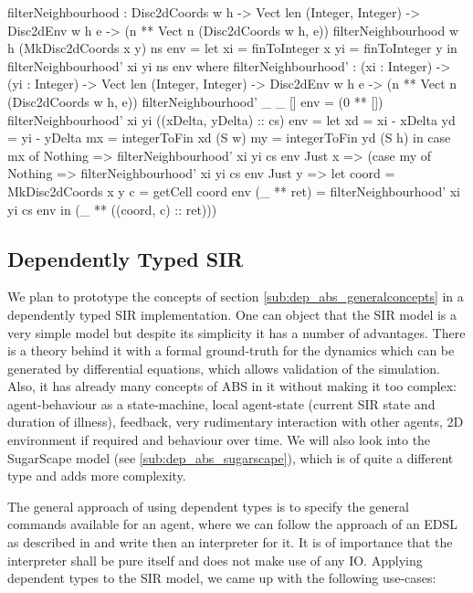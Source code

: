 \begin{HaskellCode}
filterNeighbourhood :  Disc2dCoords w h
                    -> Vect len (Integer, Integer)
                    -> Disc2dEnv w h e 
                    -> (n ** Vect n (Disc2dCoords w h, e))
filterNeighbourhood {w} {h} (MkDisc2dCoords x y) ns env =
    let xi = finToInteger x
        yi = finToInteger y
    in  filterNeighbourhood' xi yi ns env
  where
    filterNeighbourhood' :  (xi : Integer)
                         -> (yi : Integer)
                         -> Vect len (Integer, Integer)
                         -> Disc2dEnv w h e 
                         -> (n ** Vect n (Disc2dCoords w h, e))
    filterNeighbourhood' _ _ [] env = (0 ** [])
    filterNeighbourhood' xi yi ((xDelta, yDelta) :: cs) env 
      = let xd = xi - xDelta
            yd = yi - yDelta
            mx = integerToFin xd (S w)
            my = integerToFin yd (S h)
        in case mx of
            Nothing => filterNeighbourhood' xi yi cs env 
            Just x  => (case my of 
                        Nothing => filterNeighbourhood' xi yi cs env 
                        Just y  => let coord      = MkDisc2dCoords x y
                                       c          = getCell coord env
                                       (_ ** ret) = filterNeighbourhood' xi yi cs env
                                   in  (_ ** ((coord, c) :: ret)))
\end{HaskellCode}

\subsection{Dependently Typed SIR}
\label{sub:dep_abs_sir}
We plan to prototype the concepts of section \ref{sub:dep_abs_generalconcepts} in a dependently typed SIR implementation. One can object that the SIR model \cite{kermack_contribution_1927} is a very simple model but despite its simplicity it has a number of advantages. There is a theory behind it with a formal ground-truth for the dynamics which can be generated by differential equations, which allows validation of the simulation. Also, it has already many concepts of ABS in it without making it too complex: agent-behaviour as a state-machine, local agent-state (current SIR state and duration of illness), feedback, very rudimentary interaction with other agents, 2D environment if required and behaviour over time. We will also look into the SugarScape model (see \ref{sub:dep_abs_sugarscape}), which is of quite a different type and adds more complexity.

The general approach of using dependent types is to specify the general commands available for an agent, where we can follow the approach of an EDSL as described in \cite{brady_correct-by-construction_2010} and write then an interpreter for it. It is of importance that the interpreter shall be pure itself and does not make use of any IO. Applying dependent types to the SIR model, we came up with the following use-cases:


